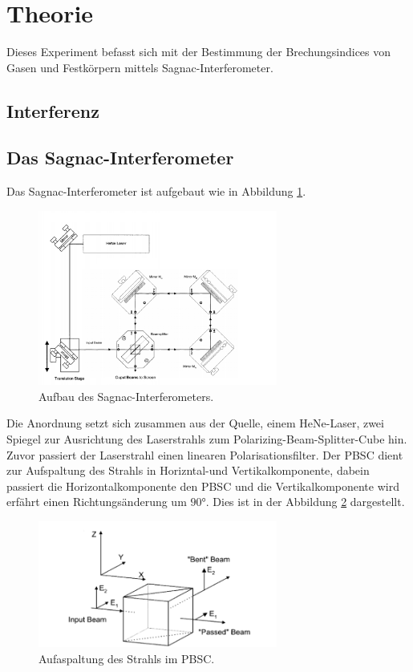 \section{Theorie}
\label{sec:Theorie}
Dieses Experiment befasst sich mit der Bestimmung der Brechungsindices
von Gasen  und Festkörpern mittels Sagnac-Interferometer.

\subsection{Interferenz}
\subsection{Das Sagnac-Interferometer}
Das Sagnac-Interferometer ist aufgebaut wie in Abbildung \ref{fig:apparat}.
\begin{figure}
    \centering
    \includegraphics[width=0.7\textwidth]{Apparatur.PNG}
    \caption{Aufbau des Sagnac-Interferometers.\cite{skript}}
    \label{fig:apparat}
\end{figure}
Die Anordnung setzt sich zusammen aus der Quelle, einem HeNe-Laser, zwei
Spiegel zur Ausrichtung des Laserstrahls zum Polarizing-Beam-Splitter-Cube hin.
Zuvor passiert der Laserstrahl einen linearen Polarisationsfilter.
Der PBSC dient zur Aufspaltung des Strahls in Horizntal-und Vertikalkomponente,
dabein passiert die Horizontalkomponente den PBSC und die Vertikalkomponente wird
erfährt einen Richtungsänderung um $90\si{\degree}$. Dies ist in der Abbildung
\ref{fig:pbsc} dargestellt.
\begin{figure}
   \centering
   \includegraphics[width=0.7\textwidth]{Pbsc.PNG}
   \caption{Aufaspaltung des Strahls im PBSC.\cite{skript}}
   \label{fig:pbsc}
\end{figure}\\
